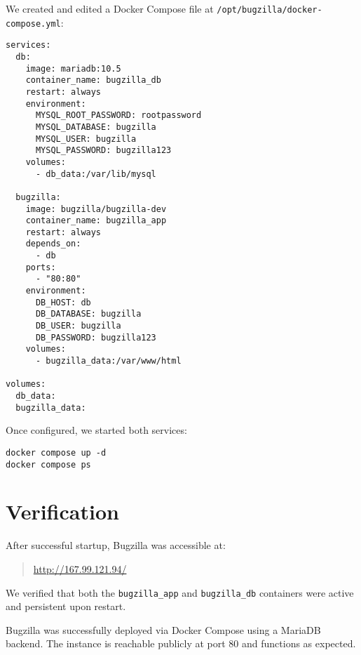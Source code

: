 We created and edited a Docker Compose file at \texttt{/opt/bugzilla/docker-compose.yml}:

\begin{verbatim}
services:
  db:
    image: mariadb:10.5
    container_name: bugzilla_db
    restart: always
    environment:
      MYSQL_ROOT_PASSWORD: rootpassword
      MYSQL_DATABASE: bugzilla
      MYSQL_USER: bugzilla
      MYSQL_PASSWORD: bugzilla123
    volumes:
      - db_data:/var/lib/mysql

  bugzilla:
    image: bugzilla/bugzilla-dev
    container_name: bugzilla_app
    restart: always
    depends_on:
      - db
    ports:
      - "80:80"
    environment:
      DB_HOST: db
      DB_DATABASE: bugzilla
      DB_USER: bugzilla
      DB_PASSWORD: bugzilla123
    volumes:
      - bugzilla_data:/var/www/html

volumes:
  db_data:
  bugzilla_data:
\end{verbatim}

Once configured, we started both services:

\begin{verbatim}
docker compose up -d
docker compose ps
\end{verbatim}

\section{Verification}

After successful startup, Bugzilla was accessible at:

\begin{quote}
\url{http://167.99.121.94/}
\end{quote}

We verified that both the \texttt{bugzilla\_app} and \texttt{bugzilla\_db} containers were active and persistent upon restart.

Bugzilla was successfully deployed via Docker Compose using a MariaDB backend.  
The instance is reachable publicly at port 80 and functions as expected.
